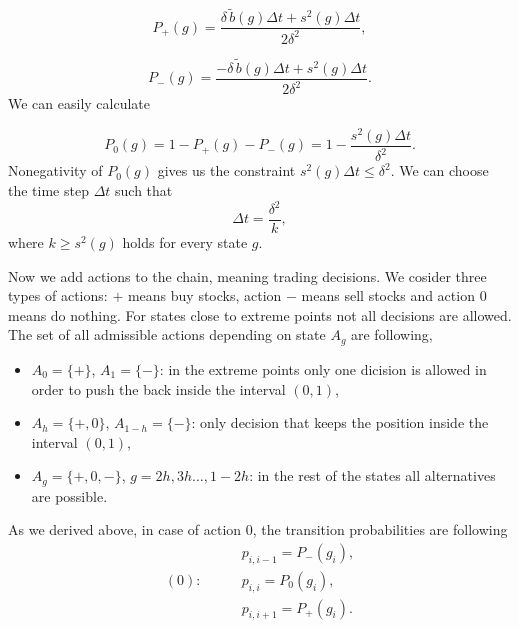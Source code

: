 \begin{equation*}
P_{+}(g)=\frac{\delta\,\widetilde{b}(g)\Delta t+s^2(g)\Delta t}{2\delta^2},%
\end{equation*}

\begin{equation*}
P_{-}(g)=\frac{-\delta\,\widetilde{b}(g)\Delta t+s^2(g)\Delta t}{2\delta^2}.%
\end{equation*}
We can easily calculate

\begin{equation*}
P_0(g)=1-P_{+}(g)-P_{-}(g)=1-\frac{s^2(g)\Delta t}{\delta^2}.
\end{equation*}
Nonegativity of $P_0(g)$ gives us the constraint $s^2(g)\Delta t\leq \delta^2$. We can choose the time step $\Delta t$ such that
\[\Delta t=\frac{\delta^2}{k},\]
where $k\geq s^2(g)$ holds for every state $g$.

Now we add actions to the chain, meaning trading decisions. We cosider three types of actions: $+$ means buy stocks, action $-$ means sell stocks and action $0$ means do nothing. For states close to extreme points not all decisions are allowed. The set of all admissible actions depending on state $A_g$ are following,  

\begin{itemize}
  \item $A_{0}=\{+\}$, $A_{1}=\{-\}$: in the extreme points only one dicision is allowed in order to push the  back inside the interval $(0,1)$, 
  \item $A_{h}=\{+,0\}$, $A_{1-h}=\{-\}$: only decision that keeps the position inside the interval $(0,1)$,
  \item $A_{g}=\{+,0,-\}$, $g=2h,3h\dots,1-2h$: in the rest of the states all alternatives are possible.
\end{itemize}

As we derived above, in case of action $0$, the transition probabilities are following
\begin{align*}
&\qquad p_{i,i-1}=P_{-}(g_i),\\
(0):&\qquad p_{i,i}=P_{0}(g_i),\\
&\qquad p_{i,i+1}=P_{+}(g_i).
\end{align*}
  
